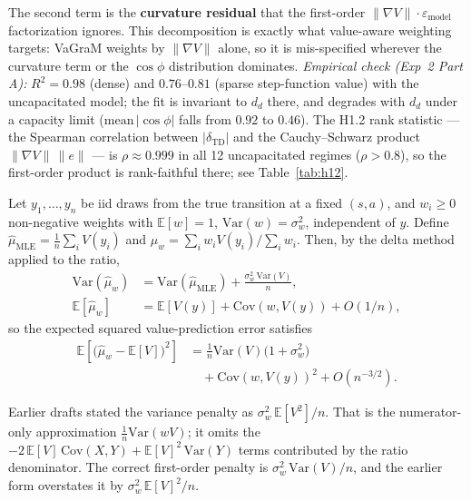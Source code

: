 \documentclass{article}
\theoremstyle{plain}
\begin{document}
The second term is the \textbf{curvature residual} that the first-order
$\lVert \nabla V\rVert \cdot \varepsilon_{\mathrm{model}}$ factorization ignores. This
decomposition is exactly what value-aware weighting targets: VaGraM weights by
$\lVert \nabla V\rVert$ alone, so it is mis-specified wherever the curvature term or the
$\cos\phi$ distribution dominates. \emph{Empirical check (Exp~2 Part A):}
$R^2 = 0.98$ (dense) and $0.76$--$0.81$ (sparse step-function value) with the
uncapacitated model; the fit is invariant to $d_d$ there, and degrades with $d_d$ under
a capacity limit ($\mathrm{mean}\,\lvert\cos\phi\rvert$ falls from $0.92$ to $0.46$).
The H1.2 rank statistic --- the Spearman correlation between $\lvert\delta_{\mathrm{TD}}\rvert$
and the Cauchy--Schwarz product $\lVert\nabla V\rVert\,\lVert e\rVert$ --- is
$\rho \approx 0.999$ in all 12 uncapacitated regimes ($\rho > 0.8$), so the first-order
product is rank-faithful there; see Table~\ref{tab:h12}.

\begin{theorem}
\label{thm:pred}
Let $y_1, \dots, y_n$ be iid draws from the true transition at a fixed $(s,a)$, and
$w_i \ge 0$ non-negative weights with $\mathbb{E}[w] = 1$, $\mathrm{Var}(w) = \sigma_w^2$,
independent of $y$. Define $\hat{\mu}_{\mathrm{MLE}} = \frac{1}{n}\sum_i V(y_i)$ and
$\hat{\mu}_w = \sum_i w_i V(y_i) / \sum_i w_i$. Then, by the delta method applied to the
ratio,
\begin{align}
  \mathrm{Var}(\hat{\mu}_w) &= \mathrm{Var}(\hat{\mu}_{\mathrm{MLE}})
    + \frac{\sigma_w^2\, \mathrm{Var}(V)}{n}, \\
  \mathbb{E}[\hat{\mu}_w] &= \mathbb{E}[V(y)] + \mathrm{Cov}(w, V(y)) + O(1/n),
\end{align}
so the expected squared value-prediction error satisfies
\begin{equation}
\begin{aligned}
  \mathbb{E}\!\left[\bigl(\hat{\mu}_w - \mathbb{E}[V]\bigr)^2\right]
  &= \frac{1}{n}\mathrm{Var}(V)\bigl(1 + \sigma_w^2\bigr) \\
  &\quad + \mathrm{Cov}(w, V(y))^2 + O(n^{-3/2}).
\end{aligned}
\end{equation}
\end{theorem}

\begin{remark}[correction]
Earlier drafts stated the variance penalty as $\sigma_w^2\,\mathbb{E}[V^2]/n$. That is
the numerator-only approximation $\frac{1}{n}\mathrm{Var}(wV)$; it omits the
$-2\,\mathbb{E}[V]\,\mathrm{Cov}(X,Y) + \mathbb{E}[V]^2\,\mathrm{Var}(Y)$ terms
contributed by the ratio denominator. The correct first-order penalty is
$\sigma_w^2\,\mathrm{Var}(V)/n$, and the earlier form overstates it by
$\sigma_w^2\,\mathbb{E}[V]^2/n$.
\end{remark}
\end{document}
